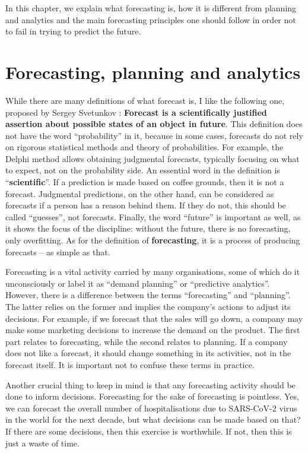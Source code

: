 \documentclass[
]{book}
\theoremstyle{definition}
\theoremstyle{definition}
\theoremstyle{definition}
\theoremstyle{definition}
\theoremstyle{remark}
\begin{document}
In this chapter, we explain what forecasting is, how it is different from planning and analytics and the main forecasting principles one should follow in order not to fail in trying to predict the future.

\hypertarget{forecastingPlanningAnalytics}{%
\section{Forecasting, planning and analytics}\label{forecastingPlanningAnalytics}}

While there are many definitions of what forecast is, I like the following one, proposed by Sergey Svetunkov \citep{Svetunkov2014Textbook}: \textbf{Forecast is a scientifically justified assertion about possible states of an object in future}. This definition does not have the word ``probability'' in it, because in some cases, forecasts do not rely on rigorous statistical methods and theory of probabilities. For example, the Delphi method allows obtaining judgmental forecasts, typically focusing on what to expect, not on the probability side. An essential word in the definition is ``\textbf{scientific}''. If a prediction is made based on coffee grounds, then it is not a forecast. Judgmental predictions, on the other hand, can be considered as forecasts if a person has a reason behind them. If they do not, this should be called ``guesses'', not forecasts. Finally, the word ``future'' is important as well, as it shows the focus of the discipline: without the future, there is no forecasting, only overfitting. As for the definition of \textbf{forecasting}, it is a process of producing forecasts -- as simple as that.

Forecasting is a vital activity carried by many organisations, some of which do it unconsciously or label it as ``demand planning'' or ``predictive analytics''. However, there is a difference between the terms ``forecasting'' and ``planning''. The latter relies on the former and implies the company's actions to adjust its decisions. For example, if we forecast that the sales will go down, a company may make some marketing decisions to increase the demand on the product. The first part relates to forecasting, while the second relates to planning. If a company does not like a forecast, it should change something in its activities, not in the forecast itself. It is important not to confuse these terms in practice.

Another crucial thing to keep in mind is that any forecasting activity should be done to inform decisions. Forecasting for the sake of forecasting is pointless. Yes, we can forecast the overall number of hospitalisations due to SARS-CoV-2 virus in the world for the next decade, but what decisions can be made based on that? If there are some decisions, then this exercise is worthwhile. If not, then this is just a waste of time.
\end{document}
